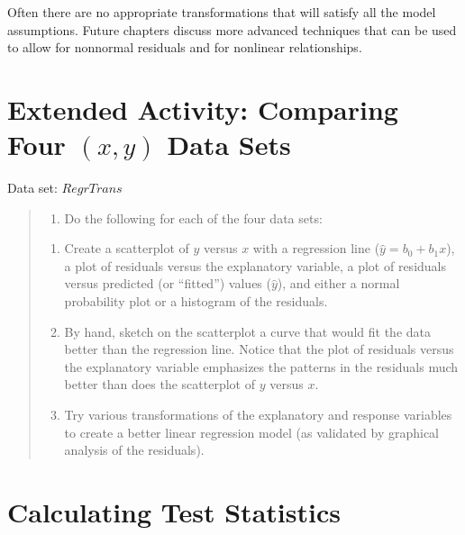 \documentclass[
]{report}
\providecommand{\tightlist}{%
  \setlength{\itemsep}{0pt}\setlength{\parskip}{0pt}}
\begin{document}
Often there are no appropriate transformations that will satisfy all the model assumptions. Future chapters discuss more advanced techniques that can be used to allow for nonnormal residuals and for nonlinear relationships.

\section*{\texorpdfstring{Extended Activity: Comparing Four \((x, y)\) Data Sets}{Extended Activity: Comparing Four (x, y) Data Sets}}\label{extended-activity-comparing-four-x-y-data-sets}

Data set: \(RegrTrans\)

\begin{quote}
\begin{enumerate}
\def\labelenumi{\arabic{enumi}.}
\setcounter{enumi}{32}
\tightlist
\item
  Do the following for each of the four data sets:\\
\end{enumerate}

\begin{enumerate}
\def\labelenumi{\alph{enumi}.}
\tightlist
\item
  Create a scatterplot of \(y\) versus \(x\) with a regression line (\(\hat{y} = b_0 + b_1 x\)), a plot of residuals versus the explanatory variable, a plot of residuals versus predicted (or ``fitted'') values (\(\hat{y}\)), and either a normal probability plot or a histogram of the residuals.\\
\item
  By hand, sketch on the scatterplot a curve that would fit the data better than the regression line. Notice that the plot of residuals versus the explanatory variable emphasizes the patterns in the residuals much better than does the scatterplot of \(y\) versus \(x\).\\
\item
  Try various transformations of the explanatory and response variables to create a better linear regression model (as validated by graphical analysis of the residuals).
\end{enumerate}
\end{quote}

\section{\texorpdfstring{\textbf{Calculating Test Statistics}}{Calculating Test Statistics}}\label{calculating-test-statistics}
\end{document}
